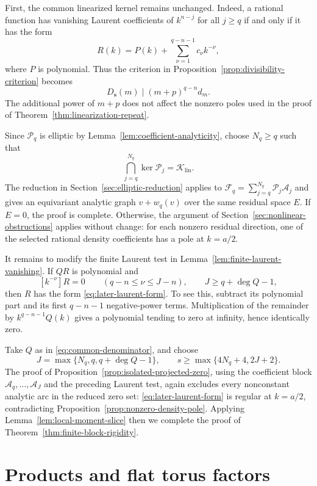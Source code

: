 \documentclass[11pt,reqno]{amsart}
\theoremstyle{corollary}
\theoremstyle{conjecture}
\theoremstyle{assumption}
\theoremstyle{proposition}
\theoremstyle{remark}
\numberwithin{equation}{section}
\begin{document}
First, the common linearized kernel remains unchanged. Indeed, a rational function has vanishing Laurent coefficients of $k^{n-j}$ for all $j\geq q$ if and only if it has the form
\begin{equation}\label{eq:later-laurent-form}
 R(k)=P(k)+\sum_{\nu=1}^{q-n-1}c_\nu k^{-\nu},
\end{equation}
where $P$ is polynomial. Thus the criterion in Proposition~\ref{prop:divisibility-criterion} becomes
\[
D_{\mathbf s}(m)\mid (m+p)^{q-n}d_m.
\]
The additional power of $m+p$ does not affect the nonzero poles used in the proof of Theorem~\ref{thm:linearization-repeat}.

Since $\mathcal P_q$ is elliptic by Lemma~\ref{lem:coefficient-analyticity}, choose $N_q\geq q$ such that
\[
 \bigcap_{j=q}^{N_q}\ker\mathcal P_j=\mathcal K_{\operatorname{lin}}.
\]
The reduction in Section~\ref{sec:elliptic-reduction} applies to $\mathcal F_q=\sum_{j=q}^{N_q}\mathcal P_j\mathcal A_j$ and gives
an equivariant analytic graph $v+w_q(v)$ over the same residual space $E$. If $E=0$, the proof is complete. Otherwise, the argument
of Section~\ref{sec:nonlinear-obstructions} applies without change: for each nonzero residual direction, one of the selected rational
density coefficients has a pole at $k=a/2$.

It remains to modify the finite Laurent test in Lemma~\ref{lem:finite-laurent-vanishing}. If $QR$ is polynomial and
\[
 [k^{-\nu}]R=0\qquad(q-n\leq\nu\leq J-n), \qquad J\geq q+\deg Q-1,
\]
then $R$ has the form \eqref{eq:later-laurent-form}. To see this, subtract its polynomial part and its first $q-n-1$ negative-power terms. Multiplication of the remainder by $k^{q-n-1}Q(k)$ gives a polynomial tending to zero at infinity, hence identically zero.

Take $Q$ as in \eqref{eq:common-denominator}, and choose
\[
 J=\max\{N_q,q,q+\deg Q-1\},\qquad s\geq\max\{4N_q+4,2J+2\}.
\]
The proof of Proposition~\ref{prop:isolated-projected-zero}, using the coefficient block $\mathcal A_q,\ldots,\mathcal A_J$ and the
preceding Laurent test, again excludes every nonconstant analytic arc in the reduced zero set: \eqref{eq:later-laurent-form} is
regular at $k=a/2$, contradicting Proposition~\ref{prop:nonzero-density-pole}. Applying Lemma~\ref{lem:local-moment-slice} then we complete the proof of Theorem~\ref{thm:finite-block-rigidity}.

\section{Products and flat torus factors}
\label{sec:products}
\end{document}
